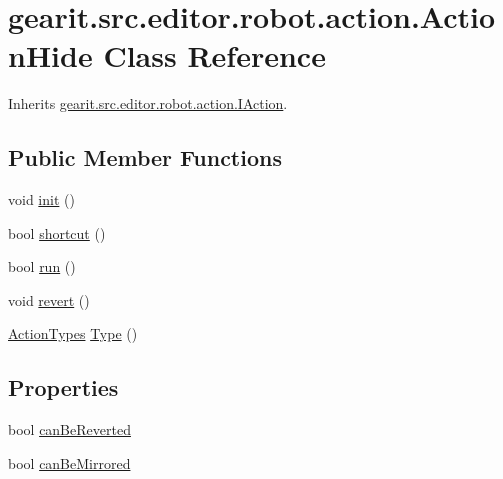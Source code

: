 \hypertarget{classgearit_1_1src_1_1editor_1_1robot_1_1action_1_1_action_hide}{\section{gearit.\+src.\+editor.\+robot.\+action.\+Action\+Hide Class Reference}
\label{classgearit_1_1src_1_1editor_1_1robot_1_1action_1_1_action_hide}
}


Inherits \hyperlink{interfacegearit_1_1src_1_1editor_1_1robot_1_1action_1_1_i_action}{gearit.\+src.\+editor.\+robot.\+action.\+I\+Action}.

\subsection*{Public Member Functions}
\begin{DoxyCompactItemize}
\item 
void \hyperlink{classgearit_1_1src_1_1editor_1_1robot_1_1action_1_1_action_hide_aba1d23c4651d656865175b3ac2344e2e}{init} ()
\item 
bool \hyperlink{classgearit_1_1src_1_1editor_1_1robot_1_1action_1_1_action_hide_af4395b89cc8e11f031c5b80095cd1221}{shortcut} ()
\item 
bool \hyperlink{classgearit_1_1src_1_1editor_1_1robot_1_1action_1_1_action_hide_ae8e33644302422d15d25708d269d9696}{run} ()
\item 
void \hyperlink{classgearit_1_1src_1_1editor_1_1robot_1_1action_1_1_action_hide_a6f1c305068f4225bb8cf6c3140eb03da}{revert} ()
\item 
\hyperlink{namespacegearit_1_1src_1_1editor_1_1robot_1_1action_a4be0fd46e3952d6135136b20e7b3fc5e}{Action\+Types} \hyperlink{classgearit_1_1src_1_1editor_1_1robot_1_1action_1_1_action_hide_a0aa0802a1a4db963534d2a3874afcba0}{Type} ()
\end{DoxyCompactItemize}
\subsection*{Properties}
\begin{DoxyCompactItemize}
\item 
bool \hyperlink{classgearit_1_1src_1_1editor_1_1robot_1_1action_1_1_action_hide_a93308ff36d895e506b394e2d7ad949c2}{can\+Be\+Reverted}
\item 
bool \hyperlink{classgearit_1_1src_1_1editor_1_1robot_1_1action_1_1_action_hide_a6378c63aab9d4f2a1aa6e62f5367baf9}{can\+Be\+Mirrored}
\end{DoxyCompactItemize}


